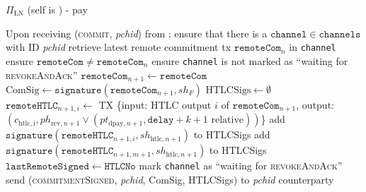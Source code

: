 \begin{protocolbox}{$\Pi_{\mathrm{LN}}$ (self is \alice) - pay}
\begin{algorithmic}[1]
    \State Upon receiving (\textsc{commit}, \textit{pchid}) from \environment:
    \Indent
      \State ensure that there is a $\mathtt{channel} \in \mathtt{channels}$
      with ID \textit{pchid}
      \State retrieve latest remote commitment tx $\mathtt{remoteCom}_n$ in
      \texttt{channel}
      \State ensure $\mathtt{remoteCom} \neq \mathtt{remoteCom}_n$
      \State ensure \texttt{channel} is not marked as ``waiting for
      \textsc{revokeAndAck}''
      \State $\mathtt{remoteCom}_{n+1} \gets \mathtt{remoteCom}$
      \State $\mathrm{ComSig} \gets
      \mathtt{signature}\left(\mathtt{remoteCom}_{n+1}, sh_F\right)$
      \State $\mathrm{HTLCSigs} \gets \emptyset$
        \State $\mathtt{remoteHTLC}_{n+1, i} \gets$ TX \{input: HTLC output $i$
        of $\mathtt{remoteCom}_{n+1}$, output: $\left(c_{\mathrm{htlc, i}},
        ph_{\mathrm{rev}, n+1} \vee \left(pt_{\mathrm{dpay}, n+1},
        \mathtt{delay} + k + 1 \text{ relative}\right)\right)$\}
        \State add $\mathtt{signature}\left(\mathtt{remoteHTLC}_{n+1, i},
        sh_{\mathrm{htlc}, n+1}\right)$ to HTLCSigs
      \EndFor
      \State add $\mathtt{signature}\left(\mathtt{remoteHTLC}_{n+1, m+1},
      sh_{\mathrm{htlc}, n+1}\right)$ to HTLCSigs
      \State $\mathtt{lastRemoteSigned} \gets \mathtt{HTLCNo}$
      \State mark \texttt{channel} as ``waiting for \textsc{revokeAndAck}''
      \State send (\textsc{commitmentSigned}, \textit{pchid}, ComSig, HTLCSigs)
      to \textit{pchid} counterparty
    \EndIndent
    \State


\end{algorithmic}
\end{protocolbox}
